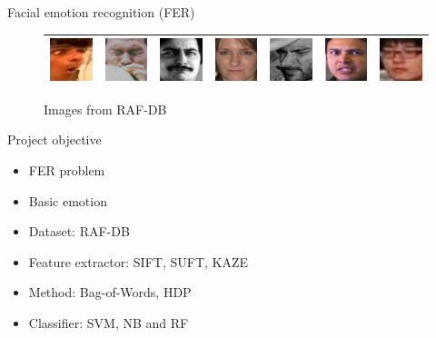 \documentclass{beamer}
\begin{document}
\begin{frame}{Facial emotion recognition (FER)}
\begin{figure}[h!]
\begin{tabular}{|c|c|c|c|c|c|c|}
  \includegraphics[width=.1\textwidth]{imgs/test_0043_aligned-1-2.jpg} &
  \includegraphics[width=.1\textwidth]{imgs/test_0274_aligned-2-2.jpg} &
  \includegraphics[width=.1\textwidth]{imgs/train_09745_aligned-3-2.jpg} &
  \includegraphics[width=.1\textwidth]{imgs/test_0055_aligned-4-2.jpg} &
  \includegraphics[width=.1\textwidth]{imgs/test_0049_aligned-5-2.jpg} &
  \includegraphics[width=.1\textwidth]{imgs/test_0057_aligned-6-2.jpg} &
  \includegraphics[width=.1\textwidth]{imgs/train_09759_aligned-7-2.jpg} \\
  \hline
\end{tabular}
\caption{Images from RAF-DB}
\label{fig:raf-db-example}
\end{figure}

\end{frame}

\begin{frame}{Project objective}
    \begin{itemize}
        \item<1-> FER problem
        \item<2-> Basic emotion
        \item<3-> Dataset: RAF-DB
        \item<4-> Feature extractor: SIFT, SUFT, KAZE
        \item<5-> Method: Bag-of-Words, HDP
        \item<6-> Classifier: SVM, NB and RF
    \end{itemize}
\end{frame}
\end{document}
